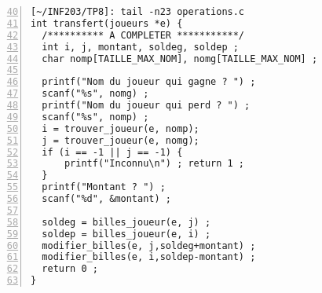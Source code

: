 \documentclass[12pt,a4paper,notitlepage,colorinlistoftodos]{article}
\begin{document}
\begin{lstlisting}[numbers=left, firstnumber = 40 ]
[~/INF203/TP8]: tail -n23 operations.c 
int transfert(joueurs *e) {
  /********** A COMPLETER ***********/
  int i, j, montant, soldeg, soldep ;
  char nomp[TAILLE_MAX_NOM], nomg[TAILLE_MAX_NOM] ;

  printf("Nom du joueur qui gagne ? ") ;
  scanf("%s", nomg) ;
  printf("Nom du joueur qui perd ? ") ;
  scanf("%s", nomp) ;
  i = trouver_joueur(e, nomp);
  j = trouver_joueur(e, nomg);
  if (i == -1 || j == -1) { 
      printf("Inconnu\n") ; return 1 ;
  }
  printf("Montant ? ") ;
  scanf("%d", &montant) ;

  soldeg = billes_joueur(e, j) ;
  soldep = billes_joueur(e, i) ;
  modifier_billes(e, j,soldeg+montant) ;
  modifier_billes(e, i,soldep-montant) ;
  return 0 ;
}
\end{lstlisting}


\cite{}


\end{document}
